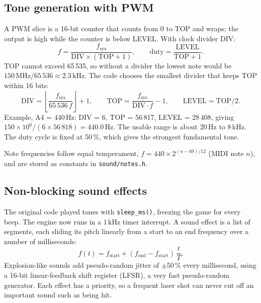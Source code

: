 \documentclass[11pt,a4paper]{article}
\newcommand{\file}[1]{\texttt{#1}}
\newcommand{\unit}[2]{\ensuremath{#1\,\mathrm{#2}}}
\begin{document}
\subsection{Tone generation with PWM}
A PWM slice is a 16-bit counter that counts from 0 to TOP and wraps; the output
is high while the counter is below LEVEL. With clock divider DIV:
\[
  f = \frac{f_{\text{sys}}}{\text{DIV}\times(\text{TOP}+1)},\qquad
  \text{duty} = \frac{\text{LEVEL}}{\text{TOP}+1}.
\]
TOP cannot exceed 65\,535, so without a divider the lowest note would be
$150\,\text{MHz}/65\,536 \approx \unit{2.3}{kHz}$. The code chooses the
smallest divider that keeps TOP within 16 bits:
\[
  \text{DIV} = \left\lfloor\frac{f_{\text{sys}}}{65\,536\, f}\right\rfloor + 1,\qquad
  \text{TOP} = \frac{f_{\text{sys}}}{\text{DIV}\cdot f} - 1,\qquad
  \text{LEVEL} = \text{TOP}/2.
\]
Example, A4 = 440\,Hz: DIV = 6, TOP = 56\,817, LEVEL = 28\,408, giving
$150\times10^6/(6\times56\,818) = \unit{440.0}{Hz}$. The usable range is about
20\,Hz to 8\,kHz. The duty cycle is fixed at 50\,\%, which gives the strongest
fundamental tone.

Note frequencies follow equal temperament, $f = 440 \times 2^{(n-69)/12}$
(MIDI note $n$), and are stored as constants in \file{sound/notes.h}.

\subsection{Non-blocking sound effects}
The original code played tones with \texttt{sleep\_ms()}, freezing the game for
every beep. The engine now runs in a \unit{1}{kHz} timer interrupt. A sound
effect is a list of segments, each sliding its pitch linearly from a start to an
end frequency over a number of milliseconds:
\[
  f(t) = f_{\text{start}} + (f_{\text{end}} - f_{\text{start}})\,\frac{t}{T}.
\]
Explosion-like sounds add pseudo-random jitter of $\pm50\,\%$ every
millisecond, using a 16-bit linear-feedback shift register (LFSR), a very fast
pseudo-random generator. Each effect has a priority, so a frequent laser shot can
never cut off an important sound such as being hit.
\end{document}
